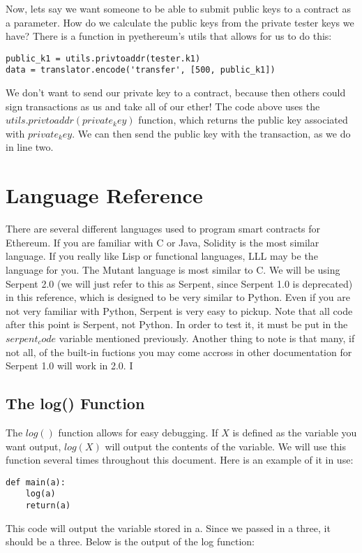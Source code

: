 \documentclass[12pt]{article}
\begin{document}
Now, lets say we want someone to be able to submit public keys to a contract as a parameter. How do we calculate the public keys from the private tester keys we have? There is a function in pyethereum's utils that allows for us to do this:

\begin{verbatim}
public_k1 = utils.privtoaddr(tester.k1)
data = translator.encode('transfer', [500, public_k1])
\end{verbatim}

We don't want to send our private key to a contract, because then others could sign transactions as us and take all of our ether! The code above uses the $utils.privtoaddr(private_key)$ function, which returns the public key associated with $private_key$. We can then send the public key with the transaction, as we do in line two.

\section{Language Reference}

There are several different languages used to program smart contracts for Ethereum. If you are familiar with C or Java, Solidity is the most similar language. If you really like Lisp or functional languages, LLL may be the language for you. The Mutant language is most similar to C. We will be using Serpent 2.0 (we will just refer to this as Serpent, since Serpent 1.0 is deprecated) in this reference, which is designed to be very similar to Python. Even if you are not very familiar with Python, Serpent is very easy to pickup. Note that all code after this point is Serpent, not Python. In order to test it, it must be put in the $serpent_code$ variable mentioned previously. Another thing to note is that many, if not all, of the built-in fuctions you may come accross in other documentation for Serpent 1.0 will work in 2.0.
I
\subsection{The log() Function}

The $log()$ function allows for easy debugging. If $X$ is defined as the variable you want output, $log(X)$ will output the contents of the variable. We will use this function several times throughout this document. Here is an example of it in use:

\begin{verbatim}
def main(a):
	log(a)
	return(a)
\end{verbatim}
This code will output the variable stored in a. Since we passed in a three, it should be a three. Below is the output of the log function:
\end{document}
